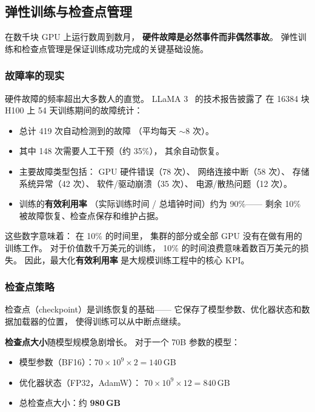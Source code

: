 \subsection{弹性训练与检查点管理}

在数千块 GPU 上运行数周到数月，
\textbf{硬件故障是必然事件而非偶然事故}。
弹性训练和检查点管理是保证训练成功完成的关键基础设施。

\subsubsection{故障率的现实}

硬件故障的频率超出大多数人的直觉。
LLaMA 3~\cite{dubey2024llama3} 的技术报告披露了
在 16384 块 H100 上 54 天训练期间的故障统计：
\begin{itemize}[noitemsep]
  \item 总计 419 次自动检测到的故障
        （平均每天 $\sim$8 次）。
  \item 其中 148 次需要人工干预（约 35\%），
        其余自动恢复。
  \item 主要故障类型包括：
        GPU 硬件错误（78 次）、
        网络连接中断（58 次）、
        存储系统异常（42 次）、
        软件/驱动崩溃（35 次）、
        电源/散热问题（12 次）。
  \item 训练的\textbf{有效利用率}
        （实际训练时间 / 总墙钟时间）约为 90\%——
        剩余 10\% 被故障恢复、检查点保存和维护占据。
\end{itemize}

这些数字意味着：
在 10\% 的时间里，
集群的部分或全部 GPU 没有在做有用的训练工作。
对于价值数千万美元的训练，
10\% 的时间浪费意味着数百万美元的损失。
因此，最大化\textbf{有效利用率}
是大规模训练工程中的核心 KPI。

\subsubsection{检查点策略}

检查点（checkpoint）是训练恢复的基础——
它保存了模型参数、优化器状态和数据加载器的位置，
使得训练可以从中断点继续。

\textbf{检查点大小}随模型规模急剧增长。
对于一个 70B 参数的模型：
\begin{itemize}[noitemsep]
  \item 模型参数（BF16）：$70 \times 10^9 \times 2 = 140$\,GB
  \item 优化器状态（FP32，AdamW）：
        $70 \times 10^9 \times 12 = 840$\,GB
  \item 总检查点大小：约 \textbf{980\,GB}
\end{itemize}

